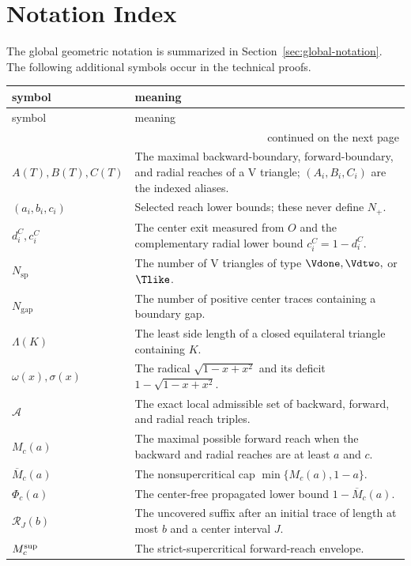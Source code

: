 \section{Notation Index}
\label{app:symbols}

The global geometric notation is summarized in Section~\ref{sec:global-notation}.
The following additional symbols occur in the technical proofs.

\small
\renewcommand{\arraystretch}{1.08}
\begin{longtable}{@{}p{}p{}@{}}
\toprule
symbol&meaning\\
\midrule
\endfirsthead
\toprule
symbol&meaning\\
\midrule
\endhead
\midrule
\multicolumn{2}{r}{continued on the next page}\\
\endfoot
\bottomrule
\endlastfoot
$A(T),B(T),C(T)$&
The maximal backward-boundary, forward-boundary, and radial reaches of a
V triangle; $(A_i,B_i,C_i)$ are the indexed aliases.\\
$(a_i,b_i,c_i)$&
Selected reach lower bounds; these never define $N_+$.\\
$d_i^C,c_i^C$&
The center exit measured from $O$ and the complementary radial lower bound
$c_i^C=1-d_i^C$.\\
$N_{\mathrm{sp}}$&
The number of V triangles of type $\Vdone,\Vdtwo,$ or $\Tlike$.\\
$N_{\mathrm{gap}}$&
The number of positive center traces containing a boundary gap.\\
$\Lambda(K)$&
The least side length of a closed equilateral triangle containing $K$.\\
$\omega(x),\sigma(x)$&
The radical $\sqrt{1-x+x^2}$ and its deficit
$1-\sqrt{1-x+x^2}$.\\
$\mathcal A$&
The exact local admissible set of backward, forward, and radial reach triples.\\
$M_c(a)$&
The maximal possible forward reach when the backward and radial reaches are at
least $a$ and $c$.\\
$\overline M_c(a)$&
The nonsupercritical cap $\min\{M_c(a),1-a\}$.\\
$\Phi_c(a)$&
The center-free propagated lower bound $1-\overline M_c(a)$.\\
$\mathcal R_J(b)$&
The uncovered suffix after an initial trace of length at most $b$ and a center
interval $J$.\\
$M_c^{\rm sup}$&
The strict-supercritical forward-reach envelope.\\

\end{longtable}
